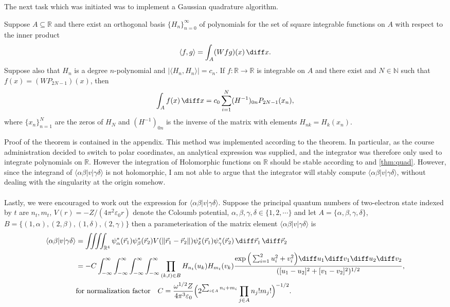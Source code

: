 \documentclass[11pt,english,a4paper]{article}
\begin{document}
The next task which was initiated was to implement a Gaussian quadrature algorithm. \begin{theorem}
Suppose $A \subseteq \mathbb{R}$ and there exist an orthogonal basis $\{H_n\}_{n=0}^\infty$ of polynomials for the set of square integrable functions on $A$ with respect to the inner product
\[
\langle f,g\rangle = \int_A (Wfg)(x)\, \diff x.
\]
Suppose also that $H_n$ is a degree $n$-polynomial and $|\langle H_n,H_n \rangle| = c_n$. If $f: \mathbb{R} \to \mathbb{R}$ is integrable on $A$ and there exist and $N \in \mathbb{N}$ such that $f(x) = (WP_{2N-1})(x)$, then 
\[
\int_A f(x)\, \diff x = c_0 \sum_{i=1}^N (H^{-1})_{0n} P_{2N-1}(x_n),
\]
where $\{x_n\}_{n=1}^N$ are the zeros of $H_N$ and $(H^{-1})_{0n}$ is the inverse of the matrix with elements $H_{nk} = H_k(x_n)$.
\end{theorem} Proof of the theorem is contained in the appendix. This method was implemented according to the theorem. In particular, as the course administration decided to switch to polar coordinates, an analytical expression was supplied, and the integrator was therefore only used to integrate polynomials on $\mathbb{R}$. However the integration of Holomorphic functions on $\mathbb{R}$ should be stable according to \cite[9,18]{stein_complex_2003} and \ref{thm:quad}. However, since the integrand of $\langle \alpha \beta | v | \gamma\delta \rangle$ is not holomorphic, I am not able to argue that the integrator will stably compute $\langle \alpha \beta | v | \gamma\delta \rangle$, without dealing with the singularity at the origin somehow. \\
\\
Lastly, we were encouraged to work out the expression for $\langle \alpha \beta | v | \gamma\delta \rangle$. Suppose the principal quantum numbers of two-electron state indexed by $t$ are $n_t,m_t$, $V(r) = -Z/(4\pi^2\varepsilon_0 r)$ denote the Coloumb potential, $\alpha,\beta,\gamma,\delta \in \{1,2,\cdots\}$ and let $A=\{ \alpha,\beta,\gamma,\delta  \}$, $B = \{(1,\alpha),(2,\beta),(1,\delta),(2,\gamma)\}$ then a parameterisation of the matrix element $\langle \alpha \beta | v  |  \gamma \delta \rangle$ is
\begin{align}
\langle \alpha \beta | v |  \gamma \delta \rangle &= \iiiint_{\mathbb{R}^4} \psi^*_\alpha(\vec{r}_1)\psi^*_\beta(\vec{r}_2)V(\| \vec{r}_1-\vec{r}_2 \|)\psi^*_\delta(\vec{r}_1)\psi^*_\gamma(\vec{r}_2)\,\diff \vec{r}_1 \, \diff \vec{r}_2 \nonumber \\
&= - C \int_{-\infty}^\infty\int_{-\infty}^\infty\int_{-\infty}^\infty\int_{-\infty}^\infty \prod_{(k,t)\in B} H_{n_t}(u_k) H_{m_t}(v_k)\frac{\exp\Big(\sum_{i=1}^2 u_i^2 + v_i^2 \Big)\diff u_1 \diff v_1 \diff u_2 \diff v_2}{([u_1 - u_2]^2 + [v_1 - v_2]^2)^{1/2}}, \nonumber \\
&\text{for normalization factor} \quad C = \frac{\omega^{1/2} Z}{4 \pi^3 \varepsilon_0}\Big( 2^{\sum_{i \in A} n_i + m_i}\prod_{j \in A}n_j!m_j! \Big)^{  -1/2}. \label{eq:matrixelt}
\end{align}
\end{document}
